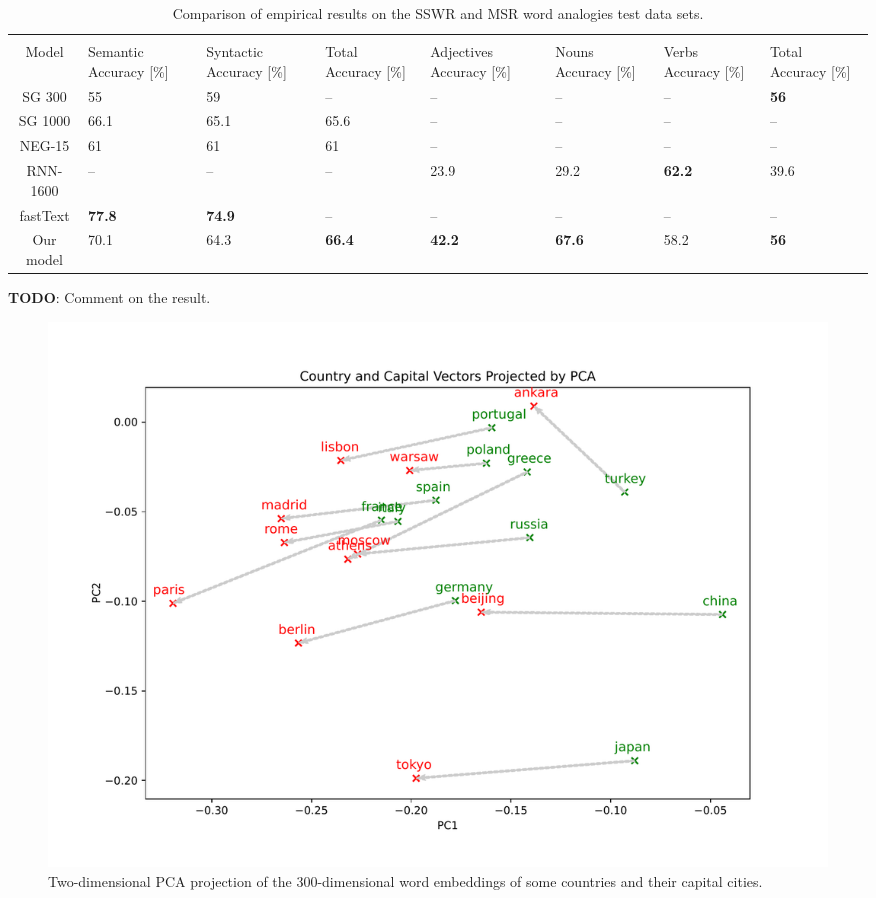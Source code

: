 \begin{table}[ht]
    \centering
    \begin{tabular}{@{}cm{1.7cm}m{1.7cm}m{1.7cm}m{1.7cm}m{1.7cm}m{1.7cm}m{1.7cm}@{}}
    \toprule
    & \multicolumn{3}{c}{\cite[SSWR]{mikolov2013a}} & \multicolumn{4}{c}{ \cite[MSR]{mikolov-etal-2013-linguistic}} \\ \cmidrule(l){2-8} 
    \multirow{-2}{*}{Model} & Semantic Accuracy {[}\%{]} & Syntactic Accuracy {[}\%{]} & Total Accuracy {[}\%{]} & Adjectives Accuracy {[}\%{]} & Nouns Accuracy {[}\%{]} & Verbs Accuracy {[}\%{]} & Total Accuracy {[}\%{]} \\ \midrule
    \rowcolor[HTML]{F5F5F5}
    SG 300 & 55 & 59 & -- & -- & -- & -- & \textbf{56} \\
    SG 1000 & 66.1 & 65.1 & 65.6 & -- & -- & -- & -- \\
    \rowcolor[HTML]{F5F5F5}
    NEG-15 & 61 & 61 & 61 & -- & -- & -- & -- \\
    RNN-1600 & -- & -- & -- & 23.9 & 29.2 & \textbf{62.2} & 39.6 \\
    \rowcolor[HTML]{F5F5F5}
    fastText & \textbf{77.8} & \textbf{74.9} & -- & -- & -- & -- & -- \\
    Our model & 70.1 & 64.3 & \textbf{66.4} & \textbf{42.2} & \textbf{67.6} & 58.2 & \textbf{56} \\
    \bottomrule
    \end{tabular}
    \caption{Comparison of empirical results on the SSWR and MSR word analogies test data sets.}
    \label{table:word2vec-eval-empirical-results}
\end{table}

\textbf{TODO}: Comment on the result.

\begin{figure}[h]
   \centering
   \includegraphics[width=\textwidth]{thesis/figures/country-capital-pca-2d.pdf}
 \caption{Two-dimensional PCA projection of the 300-dimensional word embeddings of some countries and their capital cities.}
 \label{fig:country-capital-pca-2d}
\end{figure}
